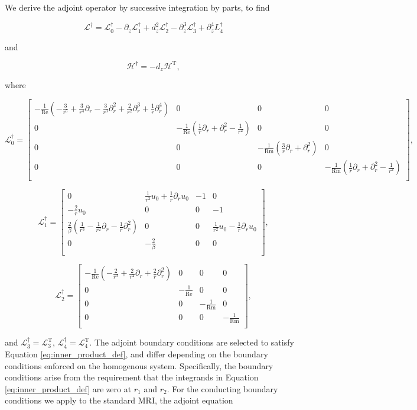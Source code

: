 \documentclass{emulateapj}
\newcommand{\beq}{\begin{equation}}
\newcommand{\eeq}{\end{equation}}
\newcommand\reye{\mathrm{Re}}
\newcommand\reym{\mathrm{Rm}}
\begin{document}
We derive the adjoint operator by successive integration by parts, to find 

\beq
\mathcal{L}^\dagger = \mathcal{L}_0^\dagger - \partial_z \mathcal{L}_1^\dagger + d_z^2 \mathcal{L}_2^\dagger - \partial_z^3 \mathcal{L}_3^\dagger + \partial_z^4 L_4^\dagger
\eeq

and 

\beq
\mathcal{H}^\dagger = - d_z \mathcal{H}^\mathrm{T},
\eeq

where 

\beq
\mathcal{L}_0^\dagger = \left[\begin{matrix}
-\frac{1}{\reye} (-\frac{3}{r^5} + \frac{3}{r^4}\partial_r - \frac{3}{r^3} \partial_r^2 + \frac{2}{r^2}\partial_r^3 + \frac{1}{r}\partial_r^4 ) & 0 & 0 & 0 \\
0 & -\frac{1}{\reye} (\frac{1}{r}\partial_r + \partial_r^2 - \frac{1}{r^2}) & 0 & 0 \\
0 & 0 &-\frac{1}{\reym} (\frac{3}{r}\partial_r + \partial_r^2) & 0 \\
0 & 0 & 0 & -\frac{1}{\reym} (\frac{1}{r}\partial_r + \partial_r^2 - \frac{1}{r^2}) \\
\end{matrix}\right],
\eeq

\beq
\mathcal{L}_1^\dagger = \left[\begin{matrix}
0 & \frac{1}{r^2} u_0 + \frac{1}{r}\partial_r u_0 & -1 & 0 \\
-\frac{2}{r}u_0 & 0 & 0 & -1 \\
\frac{2}{\beta}(\frac{1}{r^3} - \frac{1}{r^2}\partial_r - \frac{1}{r}\partial_r^2) & 0 & 0 & \frac{1}{r^2}u_0 - \frac{1}{r}\partial_r u_0 \\
0 & -\frac{2}{\beta} & 0 & 0 \\
\end{matrix}\right],
\eeq

\beq
\mathcal{L}_2^\dagger = \left[\begin{matrix}
-\frac{1}{\reye}(-\frac{2}{r^3} + \frac{2}{r^2}\partial_r + \frac{2}{r}\partial_r^2) & 0 & 0 & 0 \\
0 & -\frac{1}{\reye} & 0 & 0 \\
0 & 0 & -\frac{1}{\reym} & 0 \\
0 & 0 & 0 & -\frac{1}{\reym} \\
\end{matrix}\right],
\eeq

and $\mathcal{L}_3^\dagger = \mathcal{L}_3^\mathrm{T}$, $\mathcal{L}_4^\dagger = \mathcal{L}_4^\mathrm{T}$. The adjoint boundary conditions are selected to satisfy Equation \ref{eq:inner_product_def}, and differ depending on the boundary conditions enforced on the homogenous system. Specifically, the boundary conditions arise from the requirement that the integrands in Equation \ref{eq:inner_product_def} are zero at $r_1$ and $r_2$. For the conducting boundary conditions we apply to the standard MRI, the adjoint equation 
\end{document}
